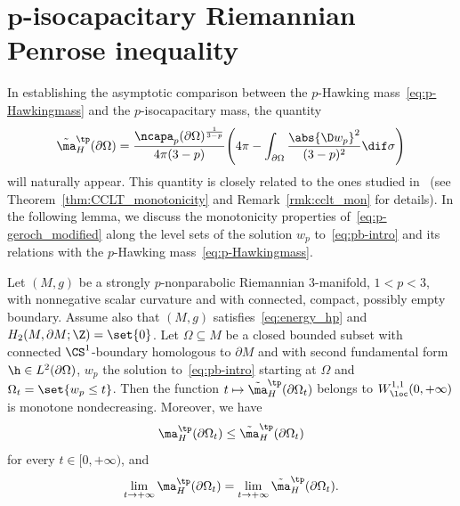 \section[p-isocapacitary Riemannian Penrose inequality]{$\boldsymbol{p}$-isocapacitary Riemannian Penrose inequality}
\label{sec:3}
In establishing the asymptotic comparison between the $p$-Hawking mass~\eqref{eq:p-Hawkingmass} and the $p$-iso\-capacitary mass, the quantity
\begin{equation}\label{eq:p-geroch_modified} \tilde{\ma}^{\tp}_H(\partial \Omega)= \frac{\ncapa_p(\partial \Omega)^{\frac{1}{3-p}}}{4\pi (3-p)}\Bigg( 4 \pi - \int_{\partial \Omega} \frac{\abs{ \D w_p}^2}{(3-p)^2} \dif \sigma\Bigg)
\end{equation}
will naturally appear. This quantity is closely related to the ones studied in~\cite{chan_monotonicitygreenfunctions_2022,munteanu_comparisontheorems3dmanifolds_2023} (see Theorem~\ref{thm:CCLT_monotonicity} and Remark~\ref{rmk:cclt_mon} for details). In the following lemma, we discuss the monotonicity properties of~\eqref{eq:p-geroch_modified} along the level sets of the solution $w_p$ to~\eqref{eq:pb-intro} and its relations with the $p$-Hawking mass~\eqref{eq:p-Hawkingmass}.

\begin{Lemma}\label{thm:inequality_modifiedgeroch_AMMO}
Let $(M,g)$ be a strongly $p$-nonparabolic Riemannian $3$-manifold, $1<p<3$, with nonnegative scalar curvature and with connected, compact, possibly empty boundary. Assume also that $(M,g)$ satisfies~\eqref{eq:energy_hp} and $H_2( M, \partial M; \Z)=\set{0}$. Let $\Omega\subseteq M$ be a closed bounded subset with connected $\CS^1$-boundary homologous to $\partial M$ and with second fundamental form $\h \in L^2(\partial \Omega)$, $w_p$ the solution to~\eqref{eq:pb-intro} starting at $\Omega$ and $\Omega_t= \set{w_p \leq t}$. Then the function $t \mapsto \tilde{\ma}^{\tp}_H(\partial \Omega_t)$ belongs to $W^{1,1}_{\loc}(0,+\infty)$ is monotone nondecreasing. Moreover, we have
\begin{equation}\label{eq:inequality_modifiedgeroch_AMMO}
 \ma^{\tp}_{H} ( \partial \Omega_t)\leq\tilde{\ma}^{\tp}_H(\partial \Omega_t)
\end{equation}
for every $t \in [0,+\infty)$, and
\begin{equation}\label{eq:limit_behaviour_phawking}
 \lim_{t \to+\infty} \ma^{\tp}_{H} ( \partial \Omega_t) = \lim_{t \to +\infty} \tilde{\ma}^{\tp}_H(\partial \Omega_t).
\end{equation}
\end{Lemma}

